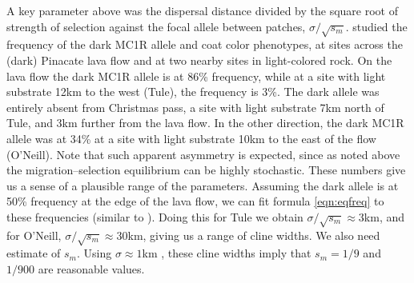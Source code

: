 \documentclass{article}
\newcommand{\citep}[1]{\cite{#1}}
\newcommand{\citet}[1]{\cite{#1}}
\begin{document}
A key parameter above was the dispersal distance divided by the square root of strength of selection against the focal allele between patches, $\sigma/\sqrt{s_m}$. 
\citet{hoekstra2004ecological} studied the frequency of the dark MC1R allele and coat color phenotypes, 
at sites across the (dark) Pinacate lava flow and at two nearby sites in light-colored rock.
On the lava flow the dark MC1R allele is at 86\% frequency,
while at a site with light substrate 12km to the west (Tule), the frequency is 3\%.
The dark allele was entirely absent from Christmas pass, a site with light substrate 7km north of Tule, and 3km further from the lava flow.
In the other direction, the dark MC1R allele was at 34\% at a site with light substrate 10km to the east of the flow (O'Neill).
Note that such apparent asymmetry is expected,
since as noted above the migration--selection equilibrium can be highly stochastic.
These numbers give us a sense of a plausible range of the parameters.
Assuming the dark allele is at 50\% frequency at the edge of the lava flow, 
we can fit formula \eqref{eqn:eqfreq} to these frequencies
(similar to \citet{hoekstra2004ecological}).
Doing this for Tule we obtain $\sigma/\sqrt{s_m} \approx 3$km, 
and for O'Neill, $\sigma/\sqrt{s_m} \approx 30$km, giving us a range of cline widths. 
We also need estimate of $s_m$. 
Using $\sigma \approx 1$km \citep{french1968dispersal,allred1963range}, 
these cline widths imply that $s_m=1/9$ and $1/900$ are reasonable values.
\end{document}
